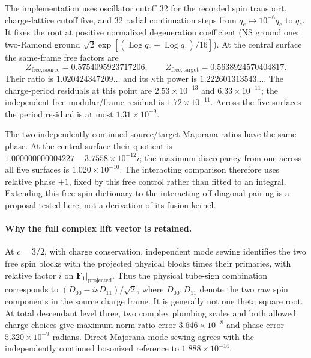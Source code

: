 The implementation
 uses oscillator
cutoff 32 for the recorded spin transport, charge-lattice cutoff
five, and 32 radial continuation steps from $q_e\mapsto10^{-6}q_e$
to $q_e$. It fixes the root at positive normalized degeneration
coefficient (NS ground one; two-Ramond ground
$\sqrt2\exp[(\operatorname{Log} q_0+\operatorname{Log} q_1)/16]$).
At the central surface the same-frame free factors are
\begin{equation}
 Z_{\mathrm{free,source}}=0.5754095923717206,\qquad
 Z_{\mathrm{free,target}}=0.5638924570404817.
 \label{eq:partition-free-values}
\end{equation}
Their ratio is $1.020424347209\ldots$ and its $\kappa$th power
is $1.222601313543\ldots$.
The charge-period residuals at this point are
$2.53\times10^{-13}$ and $6.33\times10^{-11}$;
the independent free modular/frame residual is
$1.72\times10^{-11}$. Across the five surfaces the period
residual is at most $1.31\times10^{-9}$.

The two independently continued source/target Majorana ratios
have the same phase. At the central surface their quotient is
$1.000000000004227-3.7558\times10^{-12}i$; the maximum discrepancy
from one across all five surfaces is $1.020\times10^{-10}$.
The interacting comparison therefore uses relative phase $+1$,
fixed by this free control rather than fitted to an integral.
Extending this free-spin dictionary to the interacting off-diagonal
pairing is a proposal tested here, not a derivation of its fusion
kernel.

\paragraph{Why the full complex lift vector is retained.}
At $c=3/2$, with charge conservation, independent mode sewing
identifies the two free spin blocks with the projected physical
blocks times their primaries, with relative factor $i$ on
$\mathbf F_1|_{\mathrm{projected}}$.
Thus the physical tube-sign combination corresponds to
$(D_{00}-isD_{11})/\sqrt2$, where $D_{00},D_{11}$ denote the two
raw spin components in the source charge frame. It is generally
not one theta square root. At total descendant level three, two
complex plumbing scales and both allowed charge choices give
maximum norm-ratio error $3.646\times10^{-8}$ and phase error
$5.320\times10^{-9}$ radians. Direct Majorana mode sewing
agrees with the independently continued bosonized reference to
$1.888\times10^{-14}$.

